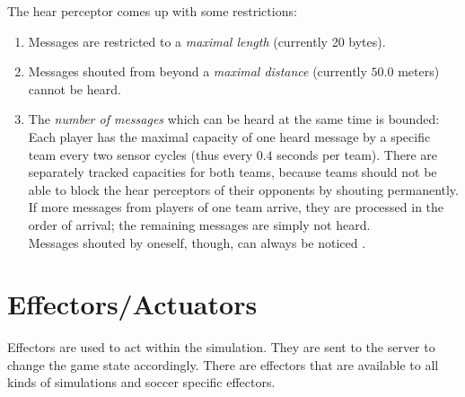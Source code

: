 The hear perceptor comes up with some restrictions:
\begin{enumerate}
	\item Messages are restricted to a \emph{maximal length} (currently 20 bytes).
	\item Messages shouted from beyond a \emph{maximal distance} (currently $50.0$ meters) cannot be heard.
	\item The \emph{number of messages} which can be heard at the same time is
	bounded: Each player has the maximal capacity of one heard message by a
	specific team every two sensor cycles (thus every $0.4$ seconds per team).
	There are separately tracked capacities for both teams, because teams should
	not be able to block the hear perceptors of their opponents by shouting
	permanently. If more messages from players of one team arrive, they are
	processed in the order of arrival; the remaining messages are simply not
	heard.\\ Messages shouted by oneself, though, can always be noticed
	\cite{Vorst06}.
\end{enumerate}





\section{Effectors/Actuators}
\label{sec:effectors}

Effectors are used to act within the simulation. They are sent to the server
to change the game state accordingly. There are effectors that are available to
all kinds of simulations and soccer specific effectors.







